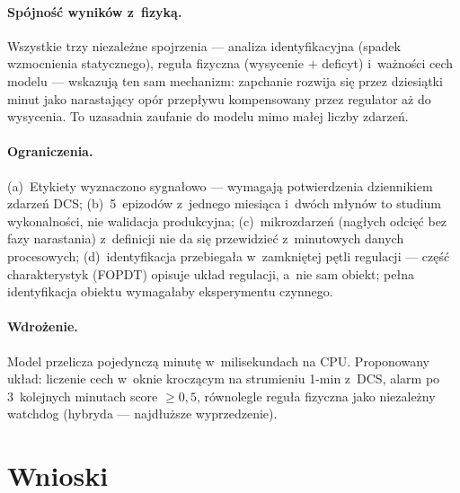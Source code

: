 \documentclass[11pt,a4paper]{article}
\begin{document}
\paragraph{Spójność wyników z~fizyką.} Wszystkie trzy niezależne spojrzenia
--- analiza identyfikacyjna (spadek wzmocnienia statycznego), reguła fizyczna
(wysycenie $+$ deficyt) i~ważności cech modelu --- wskazują ten sam mechanizm:
zapchanie rozwija się przez dziesiątki minut jako narastający opór przepływu
kompensowany przez regulator aż do wysycenia. To uzasadnia zaufanie do
modelu mimo małej liczby zdarzeń.

\paragraph{Ograniczenia.} (a)~Etykiety wyznaczono sygnałowo --- wymagają
potwierdzenia dziennikiem zdarzeń DCS; (b)~5~epizodów z~jednego miesiąca
i~dwóch młynów to studium wykonalności, nie walidacja produkcyjna;
(c)~mikrozdarzeń (nagłych odcięć bez fazy narastania) z~definicji nie da się
przewidzieć z~minutowych danych procesowych; (d)~identyfikacja przebiegała
w~zamkniętej pętli regulacji --- część charakterystyk (FOPDT) opisuje układ
regulacji, a~nie sam obiekt; pełna identyfikacja obiektu wymagałaby
eksperymentu czynnego.

\paragraph{Wdrożenie.} Model przelicza pojedynczą minutę w~milisekundach na
CPU. Proponowany układ: liczenie cech w~oknie kroczącym na strumieniu 1-min
z~DCS, alarm po 3~kolejnych minutach score $\ge 0{,}5$, równolegle reguła
fizyczna jako niezależny watchdog (hybryda --- najdłuższe wyprzedzenie).

\section{Wnioski}
\end{document}
